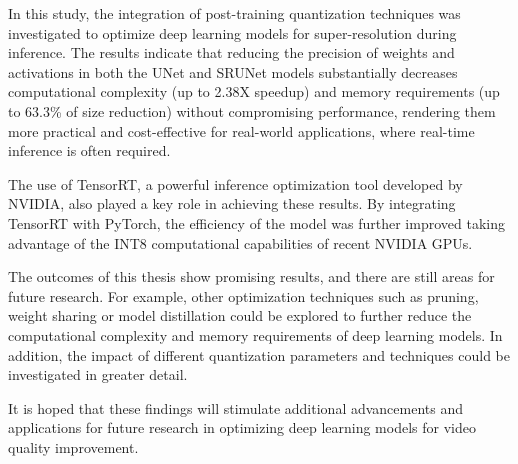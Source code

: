 \label{chap:Conclusions}

In this study, the integration of post-training quantization techniques was investigated to optimize deep learning models for super-resolution during inference. The results indicate that reducing the precision of weights and activations in both the UNet and SRUNet models substantially decreases computational complexity (up to 2.38X speedup) and memory requirements (up to 63.3\% of size reduction) without compromising performance, rendering them more practical and cost-effective for real-world applications, where real-time inference is often required.

The use of TensorRT, a powerful inference optimization tool developed by NVIDIA, also played a key role in achieving these results. By integrating TensorRT with PyTorch, the efficiency of the model was further improved taking advantage of the INT8 computational capabilities of recent NVIDIA GPUs.

The outcomes of this thesis show promising results, and there are still areas for future research. For example, other optimization techniques such as pruning, weight sharing or model distillation could be explored to further reduce the computational complexity and memory requirements of deep learning models. In addition, the impact of different quantization parameters and techniques could be investigated in greater detail.

It is hoped that these findings will stimulate additional advancements and applications for future research in optimizing deep learning models for video quality improvement.

